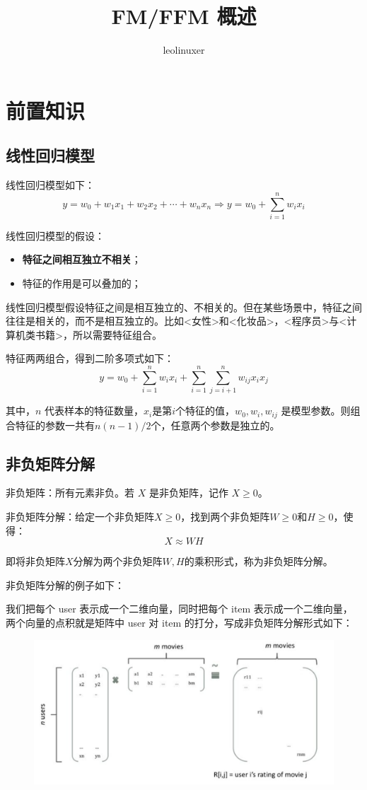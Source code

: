 \documentclass[12pt]{article}
\title{FM/FFM 概述\cite{FM_Principle_Derivation_Code_Application}}
\author{leolinuxer}
\begin{document}
\maketitle
\tableofcontents

\section{前置知识}
\subsection{线性回归模型}
线性回归模型如下：
$$
y = w_0 + w_1 x_1 + w_2 x_2 + \cdots + w_n x_n \Rightarrow y = w_0 + \sum_{i=1}^nw_ix_i
$$

线性回归模型的假设：
\begin{itemize}
\setlength{\itemsep}{0pt}
\setlength{\parsep}{0pt}
\setlength{\parskip}{0pt}
    \item \textbf{特征之间相互独立不相关}；
    \item 特征的作用是可以叠加的；
\end{itemize}

线性回归模型假设特征之间是相互独立的、不相关的。但在某些场景中，特征之间往往是相关的，而不是相互独立的。比如<女性>和<化妆品>，<程序员>与<计算机类书籍>，所以需要特征组合。

特征两两组合，得到二阶多项式如下：
$$
y = w_0 + \sum_{i=1}^nw_ix_i + \sum_{i=1}^n\sum_{j=i+1}^nw_{ij}x_ix_j
$$

其中，$n$ 代表样本的特征数量，$x_i$是第$i$个特征的值，$w_0, w_i, w_{ij}$ 是模型参数。则组合特征的参数一共有$n(n-1)/2$个，任意两个参数是独立的。

\subsection{非负矩阵分解}
非负矩阵：所有元素非负。若 $X$ 是非负矩阵，记作 $X \ge 0$。

非负矩阵分解：给定一个非负矩阵$X \ge 0$，找到两个非负矩阵$W \ge 0$和$H \ge 0$，使得：
$$
X \approx WH
$$

即将非负矩阵$X$分解为两个非负矩阵$W,H$的乘积形式，称为非负矩阵分解。

\begin{framed}
非负矩阵分解的例子如下：

我们把每个 user 表示成一个二维向量，同时把每个 item 表示成一个二维向量，两个向量的点积就是矩阵中 user 对 item 的打分，写成非负矩阵分解形式如下：
\begin{figure}[H]
    \centering
    \includegraphics[width=.6\textwidth]{fig/FM_Non_Negative_Matrix_Factorization_Example.png}
\end{figure}
\end{framed}
\end{document}
